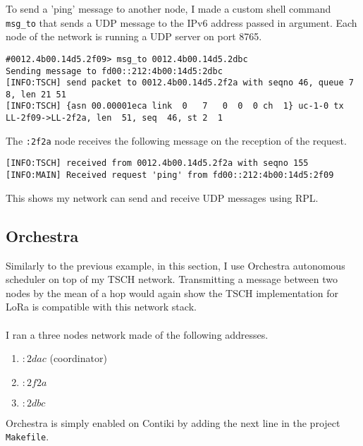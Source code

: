 To send a 'ping' message to another node, I made a custom shell
command \lstinline{msg_to} that sends a UDP message to the IPv6 address
passed in argument.
Each node of the network is running a UDP server on port 8765.

\begin{lstlisting}[language=none]
#0012.4b00.14d5.2f09> msg_to 0012.4b00.14d5.2dbc
Sending message to fd00::212:4b00:14d5:2dbc
[INFO:TSCH] send packet to 0012.4b00.14d5.2f2a with seqno 46, queue 7 8, len 21 51
[INFO:TSCH] {asn 00.00001eca link  0   7   0  0  0 ch  1} uc-1-0 tx LL-2f09->LL-2f2a, len  51, seq  46, st 2  1
\end{lstlisting}

The \lstinline{:2f2a} node receives the following message on the reception of the
request.

\begin{lstlisting}[language=none]
[INFO:TSCH] received from 0012.4b00.14d5.2f2a with seqno 155
[INFO:MAIN] Received request 'ping' from fd00::212:4b00:14d5:2f09
\end{lstlisting}

This shows my network can send and receive UDP messages using RPL.

\subsection{Orchestra\label{section:tschorchestra}}

Similarly to the previous example, in this section, I use Orchestra autonomous
scheduler on top of my TSCH network.
Transmitting a message between two nodes by the mean of a hop would again show
the TSCH implementation for LoRa is compatible with this network stack.

\paragraph{}

I ran a three nodes network made of the following addresses.

\begin{enumerate}
  \item $:2dac$ (coordinator)
  \item $:2f2a$
  \item $:2dbc$
\end{enumerate}

Orchestra is simply enabled on Contiki by adding the next line in the project
\lstinline{Makefile}.

